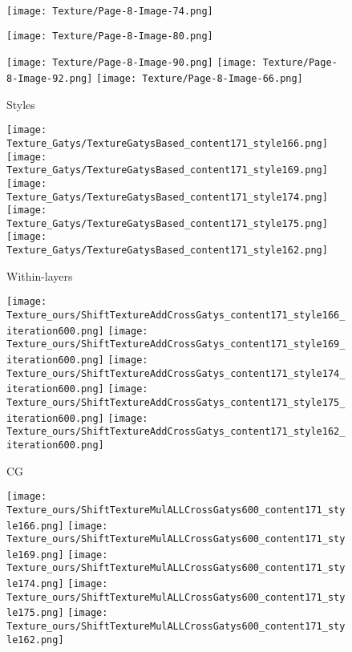   \begin{figure*}[!htbp]
  \centering
  \small 
  \begin{subfigure}[t]{0.15\textwidth}
      
      \texttt{[image: Texture/Page-8-Image-74.png]}
  
      \texttt{[image: Texture/Page-8-Image-80.png]}
  
      \texttt{[image: Texture/Page-8-Image-90.png]}
      \texttt{[image: Texture/Page-8-Image-92.png]}
      \texttt{[image: Texture/Page-8-Image-66.png]}
  
      \caption{Styles}
  \end{subfigure}
  \begin{subfigure}[t]{0.15\textwidth}
      
      \texttt{[image: Texture\_Gatys/TextureGatysBased\_content171\_style166.png]}
      \texttt{[image: Texture\_Gatys/TextureGatysBased\_content171\_style169.png]}
      \texttt{[image: Texture\_Gatys/TextureGatysBased\_content171\_style174.png]}
      \texttt{[image: Texture\_Gatys/TextureGatysBased\_content171\_style175.png]}  
      \texttt{[image: Texture\_Gatys/TextureGatysBased\_content171\_style162.png]}
  
      \caption{Within-layers}
  \end{subfigure}
  
  \begin{subfigure}[t]{0.15\textwidth}
      
      \texttt{[image: Texture\_ours/ShiftTextureAddCrossGatys\_content171\_style166\_iteration600.png]}
      \texttt{[image: Texture\_ours/ShiftTextureAddCrossGatys\_content171\_style169\_iteration600.png]}
      \texttt{[image: Texture\_ours/ShiftTextureAddCrossGatys\_content171\_style174\_iteration600.png]}
      \texttt{[image: Texture\_ours/ShiftTextureAddCrossGatys\_content171\_style175\_iteration600.png]}
      \texttt{[image: Texture\_ours/ShiftTextureAddCrossGatys\_content171\_style162\_iteration600.png]}
      \caption{CG}
  \end{subfigure}
  \begin{subfigure}[t]{0.15\textwidth}
  
      \texttt{[image: Texture\_ours/ShiftTextureMulALLCrossGatys600\_content171\_style166.png]}
      \texttt{[image: Texture\_ours/ShiftTextureMulALLCrossGatys600\_content171\_style169.png]}
      \texttt{[image: Texture\_ours/ShiftTextureMulALLCrossGatys600\_content171\_style174.png]}
      \texttt{[image: Texture\_ours/ShiftTextureMulALLCrossGatys600\_content171\_style175.png]}
      \texttt{[image: Texture\_ours/ShiftTextureMulALLCrossGatys600\_content171\_style162.png]}
  

\end{subfigure}
\end{figure*}
